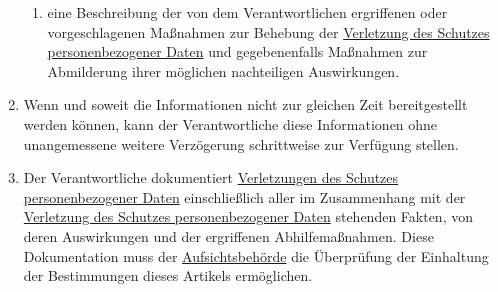 \begin{enumerate}
\begin{enumerate}
    \item eine Beschreibung der von dem Verantwortlichen ergriffenen oder vorgeschlagenen Maßnahmen zur Behebung der
     \hyperref[itm:04-12]{Verletzung des Schutzes personenbezogener Daten} und gegebenenfalls Maßnahmen zur Abmilderung ihrer möglichen
     nachteiligen Auswirkungen.
    \label{itm:33-3d}

  \end{enumerate}

  \item Wenn und soweit die Informationen nicht zur gleichen Zeit bereitgestellt werden können, kann der Verantwortliche
   diese Informationen ohne unangemessene weitere Verzögerung schrittweise zur Verfügung stellen.
  \label{itm:33-4}

  \item Der Verantwortliche dokumentiert \hyperref[itm:04-12]{Verletzungen des Schutzes personenbezogener Daten} einschließlich aller im
   Zusammenhang mit der \hyperref[itm:04-12]{Verletzung des Schutzes personenbezogener Daten} stehenden Fakten, von deren Auswirkungen und
   der ergriffenen Abhilfemaßnahmen. Diese Dokumentation muss der \hyperref[itm:04-21]{Aufsichtsbehörde} die Überprüfung der Einhaltung der
   Bestimmungen dieses Artikels ermöglichen.
  \label{itm:33-5}

\end{enumerate}


